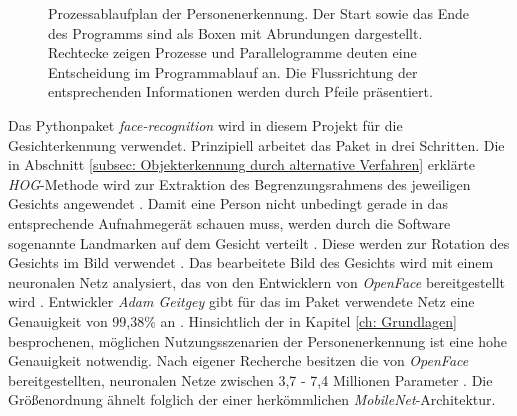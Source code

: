 \begin{figure}[H]
			\caption{Prozessablaufplan der Personenerkennung. Der Start sowie das Ende des Programms sind als Boxen mit Abrundungen dargestellt. Rechtecke zeigen Prozesse und Parallelogramme deuten eine Entscheidung im Programmablauf an. Die Flussrichtung der entsprechenden Informationen werden durch Pfeile präsentiert.}
			\label{fig: Personenerkennung}
		\end{figure}
		\newpage
		
	Das Pythonpaket \textit{face-recognition} wird in diesem Projekt für die Gesichterkennung verwendet. Prinzipiell arbeitet das Paket in drei Schritten. Die in Abschnitt \ref{subsec: Objekterkennung durch alternative Verfahren} erklärte \textit{HOG}-Methode wird zur Extraktion des Begrenzungsrahmens des jeweiligen Gesichts angewendet \cite{facerecarticle}. Damit eine Person nicht unbedingt gerade in das entsprechende Aufnahmegerät schauen muss, werden durch die Software sogenannte Landmarken auf dem Gesicht verteilt \cite{facerecarticle}. Diese werden zur Rotation des Gesichts im Bild verwendet \cite{facerecarticle}. Das bearbeitete Bild des Gesichts wird mit einem neuronalen Netz analysiert, das von den Entwicklern von \textit{OpenFace} bereitgestellt wird \cite{facerecarticle}. Entwickler \textit{Adam Geitgey} gibt für das im Paket verwendete Netz eine Genauigkeit von 99,38$\percent$ an \cite{facerecognition}. Hinsichtlich der in Kapitel \ref{ch: Grundlagen} besprochenen, möglichen Nutzungsszenarien der Personenerkennung ist eine hohe Genauigkeit notwendig. Nach eigener Recherche besitzen die von \textit{OpenFace} bereitgestellten, neuronalen Netze zwischen 3,7 - 7,4 Millionen Parameter \cite{openface}. Die Größenordnung ähnelt folglich der einer herkömmlichen \textit{MobileNet}-Architektur.\\
	
